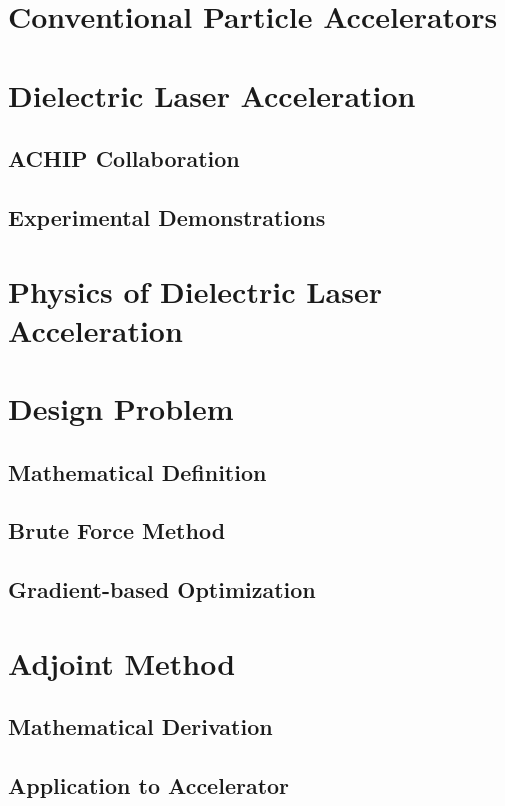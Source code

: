 \section{Conventional Particle Accelerators}

\section{Dielectric Laser Acceleration}

\subsection{ACHIP Collaboration}
\subsection{Experimental Demonstrations}

\section{Physics of Dielectric Laser Acceleration}

\section{Design Problem}

\subsection{Mathematical Definition}

\subsection{Brute Force Method}

\subsection{Gradient-based Optimization}

\section{Adjoint Method}

\subsection{Mathematical Derivation}

\subsection{Application to Accelerator}

